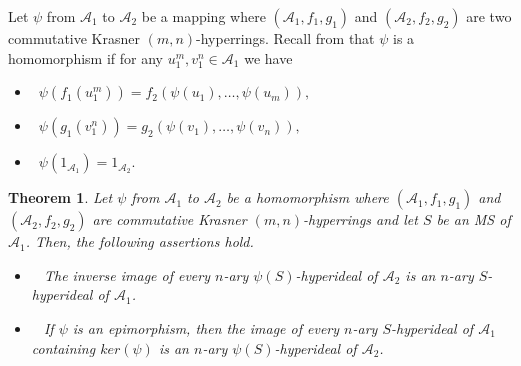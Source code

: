 \documentclass[preprint,review,10pt]{amsart}
\newtheorem{theorem}{Theorem}[section]
\theoremstyle{definition}
\theoremstyle{remark}
\numberwithin{equation}{section}
\begin{document}
Let $\psi$ from $\mathscr{A}_1$ to $\mathscr{A}_2$ be a mapping  where $(\mathscr{A}_1, f_1, g_1)$ and $(\mathscr{A}_2, f_2, g_2)$ are two commutative Krasner $(m, n)$-hyperrings. Recall from \cite{d1} that $\psi$ is  a homomorphism if for any $u^m _1, v^n_ 1 \in \mathscr{A}_1$ we have
\begin{itemize}
\item[\rm{(i)}]~$\psi(f_1(u_1^m)) = f_2(\psi(u_1),\ldots, \psi(u_m)),$
\item[\rm{(ii)}]~$\psi(g_1(v_1^n)) = g_2(\psi(v_1),\ldots,\psi(v_n)),$
\item[\rm{(iii)}]~$\psi(1_{\mathscr{A}_1})=1_{\mathscr{A}_2}.$
\end{itemize}
\begin{theorem} \label{homo}
Let $\psi$ from $\mathscr{A}_1$ to $\mathscr{A}_2$ be a homomorphism where $(\mathscr{A}_1, f_1, g_1)$ and $(\mathscr{A}_2, f_2, g_2)$ are  commutative Krasner $(m,n)$-hyperrings and let $S$ be an MS of  $\mathscr{A}_1$. Then, the following assertions  hold. 
\begin{itemize}
\item[\rm{(ii)}]~ The inverse image of every $n$-ary $\psi(S)$-hyperideal of $\mathscr{A}_2$ is an $n$-ary $S$-hyperideal of $\mathscr{A}_1$.
\item[\rm{(ii)}]~ If $\psi$ is an epimorphism, then the image of every $n$-ary $S$-hyperideal of $\mathscr{A}_1$ containing $ker (\psi)$ is an $n$-ary $\psi(S)$-hyperideal of $\mathscr{A}_2$.
\end{itemize} 
\end{theorem}
\end{document}
